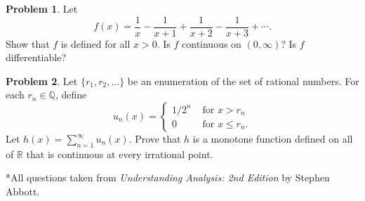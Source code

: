\documentclass{amsart}
\newcommand{\+}[1]{\ensuremath{\mathbf{#1}}}
\newcommand{\R}{{\mathbb R}}
\theoremstyle{definition}
\newtheorem{prob}{Problem}
\begin{document}
\begin{prob}
 Let \[
f(x) = \frac{1}{x} - \frac{1}{x+1} + \frac{1}{x+2}
- \frac{1}{x+3} + \cdots .
\]
Show that $f$ is defined for all $x > 0$.
Is $f$ continuous on $(0, \infty)$?
Is $f$ differentiable?
\end{prob}

\begin{prob}
Let $\{r_1, r_2, \ldots\}$
be an enumeration of the set of rational numbers.
For each $r_n \in \mathbb{Q}$, define
\[
 u_n(x) =
 \begin{cases}
  1/2^n &\text{ for } x > r_n \\
  0 &\text{ for } x \leq r_n.
 \end{cases}
\]
Let $h(x) = \sum^{\infty}_{n=1} u_n(x).$
Prove that $h$ is a monotone function defined on
all of $\R$ that is continuous at every irrational point.
\end{prob}



\vspace{5mm}

*All questions taken from \emph{Understanding Analysis: 2nd Edition} by Stephen Abbott.
\end{document}
